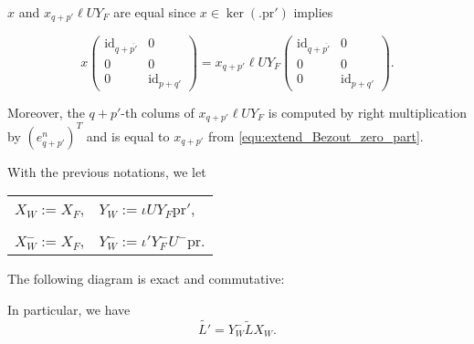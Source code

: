 \documentclass{ifacconf}
\newcommand\id[1]{\text{id}_{#1}}
\newcommand\p{\text{pr}}
\begin{document}
\begin{pf}
\begin{enumerate}
    $x$ and $x_{q+p'}\ell UY_F$ are equal since $x\in\ker(.\p')$ implies
    \medskip
    \begin{small}
      \[x\begin{pmatrix}
        \id{q+\overline{p'}} & 0\\
        0 & 0\\
        0 & \id{p+q'}
        \end{pmatrix}=x_{q+p'}\ell UY_F\begin{pmatrix}
        \id{q+\overline{p'}} & 0\\
        0 & 0\\
        0 & \id{p+q'}
        \end{pmatrix}.
      \]
    \end{small}
    \medskip
    Moreover, the $q+p'$-th colums of $x_{q+p'}\ell UY_F$ is computed
    by right multiplication by $(e^n_{q+p'})^T$ and is equal to
    $x_{q+p'}$ from \eqref{equ:extend_Bezout_zero_part}.
    \end{enumerate}
\end{pf}

\bigskip

\begin{thm}\label{thm:reduction_id}
  With the previous notations, we let
  \begin{center}
    \begin{tabular}{l l}
      $X_W:=X_F$, & $Y_W:=\iota UY_F\p'$,\\
      & \\
      $X_W^-:=X_F$, & $Y_W^-:=\iota'Y_F^-U^-\p$.
    \end{tabular}
  \end{center}
  \medskip
  The following diagram is exact and commutative:
  \begin{center}
  \end{center}
  In particular, we have
  \[\tilde{L'}=Y_W^-\tilde{L}X_W.\]
\end{thm}
\end{document}

